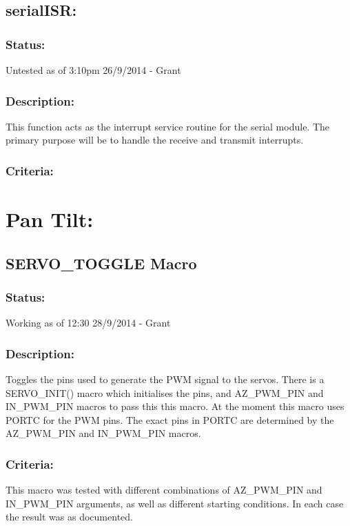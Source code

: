 \documentclass[]{article}
\begin{document}
\subsection{serialISR:}
\subsubsection{Status:}
Untested as of 3:10pm 26/9/2014 - Grant

\subsubsection{Description:}
This function acts as the interrupt service routine for the serial module. The primary purpose will be to handle the receive and transmit interrupts.

\subsubsection{Criteria:}

\section{Pan Tilt:}

\subsection{SERVO\_TOGGLE Macro}

\subsubsection{Status:}
Working as of 12:30 28/9/2014 - Grant

\subsubsection{Description:}
Toggles the pins used to generate the PWM signal to the servos. There is a SERVO\_INIT() macro which initialises the pins, and AZ\_PWM\_PIN and IN\_PWM\_PIN macros to pass this this macro. At the moment this macro uses PORTC for the PWM pins. The exact pins in PORTC are determined by the AZ\_PWM\_PIN and IN\_PWM\_PIN macros.

\subsubsection{Criteria:}
This macro was tested with different combinations of AZ\_PWM\_PIN and IN\_PWM\_PIN arguments, as well as different starting conditions. In each case the result was as documented.
\end{document}
